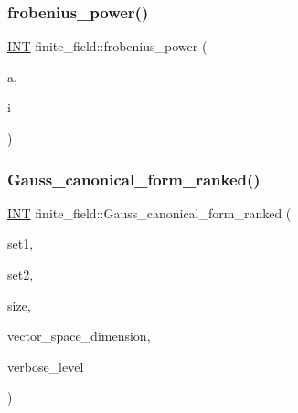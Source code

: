 \mbox{\label{classfinite__field_aec23e43aaefc0ed601cdfa3139496a92}} 
\subsubsection{\texorpdfstring{frobenius\+\_\+power()}{frobenius\_power()}}
{\footnotesize\ttfamily \mbox{\hyperlink{galois_8h_a09fddde158a3a20bd2dcadb609de11dc}{I\+NT}} finite\+\_\+field\+::frobenius\+\_\+power (\begin{DoxyParamCaption}\item[{\mbox{\hyperlink{galois_8h_a09fddde158a3a20bd2dcadb609de11dc}{I\+NT}}}]{a,  }\item[{\mbox{\hyperlink{galois_8h_a09fddde158a3a20bd2dcadb609de11dc}{I\+NT}}}]{i }\end{DoxyParamCaption})}

\mbox{\label{classfinite__field_a029a33b16ccf7b6f95bb5691ca71dc47}} 
\subsubsection{\texorpdfstring{Gauss\+\_\+canonical\+\_\+form\+\_\+ranked()}{Gauss\_canonical\_form\_ranked()}}
{\footnotesize\ttfamily \mbox{\hyperlink{galois_8h_a09fddde158a3a20bd2dcadb609de11dc}{I\+NT}} finite\+\_\+field\+::\+Gauss\+\_\+canonical\+\_\+form\+\_\+ranked (\begin{DoxyParamCaption}\item[{\mbox{\hyperlink{galois_8h_a09fddde158a3a20bd2dcadb609de11dc}{I\+NT}} $\ast$}]{set1,  }\item[{\mbox{\hyperlink{galois_8h_a09fddde158a3a20bd2dcadb609de11dc}{I\+NT}} $\ast$}]{set2,  }\item[{\mbox{\hyperlink{galois_8h_a09fddde158a3a20bd2dcadb609de11dc}{I\+NT}}}]{size,  }\item[{\mbox{\hyperlink{galois_8h_a09fddde158a3a20bd2dcadb609de11dc}{I\+NT}}}]{vector\+\_\+space\+\_\+dimension,  }\item[{\mbox{\hyperlink{galois_8h_a09fddde158a3a20bd2dcadb609de11dc}{I\+NT}}}]{verbose\+\_\+level }\end{DoxyParamCaption})}

